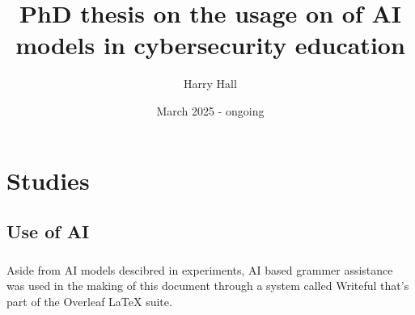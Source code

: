 \documentclass{book}
\title{PhD thesis on the usage on of AI models in cybersecurity education}
\author{Harry Hall}
\date{March 2025 - ongoing}
\begin{document}
\frontmatter

\maketitle
\tableofcontents



\mainmatter





\chapter{Studies}


\backmatter


\printglossary[type=\acronymtype]
\printbibliography{}
\section*{Use of AI}
\paragraph{}Aside from AI models descibred in experiments, AI based grammer assistance was used in the making of this document through a system called Writeful that's part of the Overleaf LaTeX suite.



\printglossary
\end{document}
